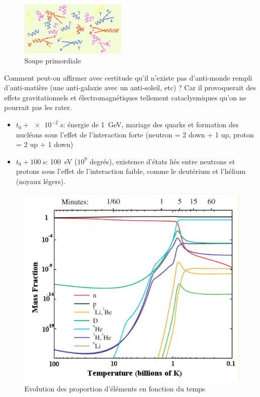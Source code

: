 \begin{figure}[ht]
    \centering
    \includegraphics[width=0.45\textwidth]{Images1/soupe.png}
    \caption{Soupe primordiale}
    \label{fig:soupe_promordiale}
\end{figure}

\begin{rem}
    Comment peut-on affirmer avec certitude qu'il n'existe pas d'anti-monde rempli d'anti-matière (une anti-galaxie avec un anti-soleil, etc) ? Car il provoquerait des effets gravitationnels et électromagnétiques tellement cataclysmiques qu'on ne pourrait pas les rater.
\end{rem}

\begin{itemize}
    \item $t_0 + \SI{e-2}{s}$: énergie de \SI{1}{GeV}, mariage des quarks et formation des nucléons sous l'effet de l'interaction forte (neutron = 2 down + 1 up, proton = 2 up + 1 down)
    \item $t_0+ \SI{100}{s}$: \SI{100}{eV} ($10^9$ degrés), existence d'états liés entre neutrons et protons sous l'effet de l'interaction faible, comme le deutérium et l'hélium (noyaux légers).
\end{itemize}

\begin{figure}[ht]
    \centering
    \includegraphics[scale=0.50]{Images1/tempmass.png}
    \caption{Evolution des proportion d'éléments en fonction du temps}
\end{figure}

